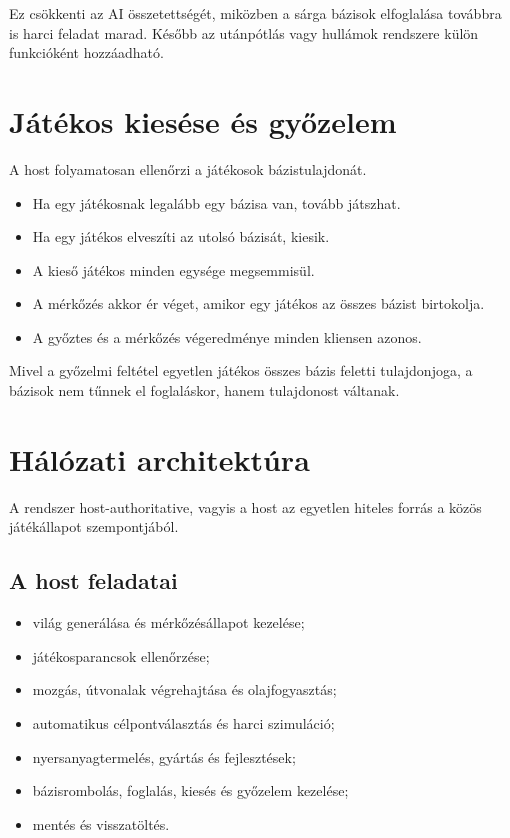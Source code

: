 \documentclass[12pt,a4paper]{article}
\begin{document}
Ez csökkenti az AI összetettségét, miközben a sárga bázisok elfoglalása továbbra is harci feladat marad. Később az utánpótlás vagy hullámok rendszere külön funkcióként hozzáadható.

\section{Játékos kiesése és győzelem}

A host folyamatosan ellenőrzi a játékosok bázistulajdonát.

\begin{itemize}
  \item Ha egy játékosnak legalább egy bázisa van, tovább játszhat.
  \item Ha egy játékos elveszíti az utolsó bázisát, kiesik.
  \item A kieső játékos minden egysége megsemmisül.
  \item A mérkőzés akkor ér véget, amikor egy játékos az összes bázist birtokolja.
  \item A győztes és a mérkőzés végeredménye minden kliensen azonos.
\end{itemize}

Mivel a győzelmi feltétel egyetlen játékos összes bázis feletti tulajdonjoga, a bázisok nem tűnnek el foglaláskor, hanem tulajdonost váltanak.

\section{Hálózati architektúra}

A rendszer host-authoritative, vagyis a host az egyetlen hiteles forrás a közös játékállapot szempontjából.

\subsection{A host feladatai}

\begin{itemize}
  \item világ generálása és mérkőzésállapot kezelése;
  \item játékosparancsok ellenőrzése;
  \item mozgás, útvonalak végrehajtása és olajfogyasztás;
  \item automatikus célpontválasztás és harci szimuláció;
  \item nyersanyagtermelés, gyártás és fejlesztések;
  \item bázisrombolás, foglalás, kiesés és győzelem kezelése;
  \item mentés és visszatöltés.
\end{itemize}
\end{document}
